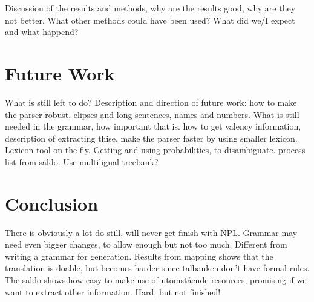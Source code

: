 \documentclass{article}
\begin{document}
Discussion of the results and methods, why are the results good, why are they not better.
What other methods could have been used? What did we/I expect and what happend?


\section{Future Work}
What is still left to do? Description and direction of future work:
how to make the parser robust, elipses and long sentences, names and numbers.
What is still needed in the grammar, how important that is. 
how to get valency information, description of extracting thise.
make the parser faster by using smaller lexicon.
Lexicon tool on the fly.
Getting and using probabilities, to disambiguate.
process list from saldo.
Use multiligual treebank?


\section{Conclusion}
There is obviously a lot do still, will never get finish with NPL.
Grammar may need even bigger changes, to allow enough but not too much.
Different from writing a grammar for generation.
Results from mapping shows that the translation is doable, but becomes harder
since talbanken don't have formal rules.
The saldo shows how easy to make use of utomstående resources, promising if
we want to extract other information. 
Hard, but not finished! 
\end{document}
